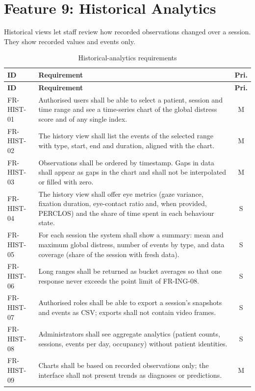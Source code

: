\documentclass[a4paper,11pt]{scrreprt}
\makeatletter
\newenvironment{reqtable}[1]{%
  \small
  \begin{longtable}{@{}>{\ttfamily\footnotesize}p{2.55cm}>{\raggedright\arraybackslash}p{10.7cm}c@{}}
  \caption{#1}\\
  \toprule \textbf{ID} & \textbf{Requirement} & \textbf{Pri.}\\ \midrule
  \endfirsthead
  \toprule \textbf{ID} & \textbf{Requirement} & \textbf{Pri.}\\ \midrule
  \endhead
  \bottomrule
  \endfoot
}{%
  \end{longtable}\normalsize
}
\newcommand{\req}[3]{#1 & #2 & #3 \\ \midrule}
\makeatother
\begin{document}
\section{Feature 9: Historical Analytics}
Historical views let staff review how recorded observations changed over a session. They show recorded values and events only.
\begin{reqtable}{Historical-analytics requirements}
\req{FR-HIST-01}{Authorised users shall be able to select a patient, session and time range and see a time-series chart of the global distress score and of any single index.}{M}
\req{FR-HIST-02}{The history view shall list the events of the selected range with type, start, end and duration, aligned with the chart.}{M}
\req{FR-HIST-03}{Observations shall be ordered by timestamp. Gaps in data shall appear as gaps in the chart and shall not be interpolated or filled with zero.}{M}
\req{FR-HIST-04}{The history view shall offer eye metrics (gaze variance, fixation duration, eye-contact ratio and, when provided, PERCLOS) and the share of time spent in each behaviour state.}{S}
\req{FR-HIST-05}{For each session the system shall show a summary: mean and maximum global distress, number of events by type, and data coverage (share of the session with fresh data).}{S}
\req{FR-HIST-06}{Long ranges shall be returned as bucket averages so that one response never exceeds the point limit of FR-ING-08.}{S}
\req{FR-HIST-07}{Authorised roles shall be able to export a session's snapshots and events as CSV; exports shall not contain video frames.}{S}
\req{FR-HIST-08}{Administrators shall see aggregate analytics (patient counts, sessions, events per day, occupancy) without patient identities.}{S}
\req{FR-HIST-09}{Charts shall be based on recorded observations only; the interface shall not present trends as diagnoses or predictions.}{M}
\end{reqtable}
\end{document}
